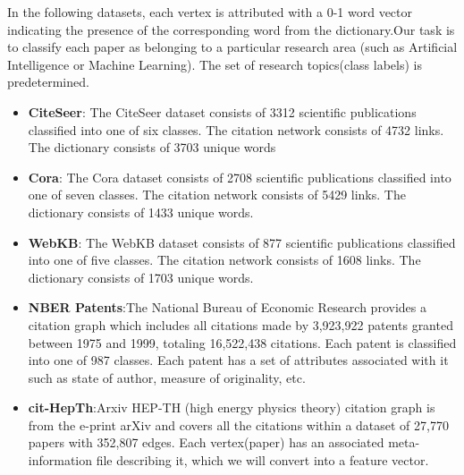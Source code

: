 \documentclass{article}
\begin{document}
In the following datasets, each vertex is attributed with a 0-1 word vector indicating the presence of the corresponding word from the dictionary.Our task is to classify each paper as belonging to a particular research area (such as Artificial Intelligence or Machine Learning). The set of research topics(class labels) is predetermined.
\begin{itemize}
\item \textbf{CiteSeer}: The CiteSeer dataset consists of 3312 scientific publications classified into one of six classes. The citation network consists of 4732 links. The dictionary consists of 3703 unique words
\item \textbf {Cora}: The Cora dataset consists of 2708 scientific publications classified into one of seven classes. The citation network consists of 5429 links. The dictionary consists of 1433 unique words. 
\item \textbf{WebKB}: The WebKB dataset consists of 877 scientific publications classified into one of five classes. The citation network consists of 1608 links. The dictionary consists of 1703 unique words.
\item \textbf{NBER Patents}:The National Bureau of Economic Research provides a citation graph which includes all citations made by 3,923,922 patents granted between 1975 and 1999, totaling 16,522,438 citations. Each patent is classified into one of 987 classes. Each patent has a set of attributes associated with it such as state of author, measure of originality, etc.
\item \textbf{cit-HepTh}:Arxiv HEP-TH (high energy physics theory) citation graph is from the e-print arXiv and covers all the citations within a dataset of 27,770 papers with 352,807 edges. Each vertex(paper) has an associated meta-information file describing it, which we will convert into a feature vector.
\end{itemize}   
\end{document}
